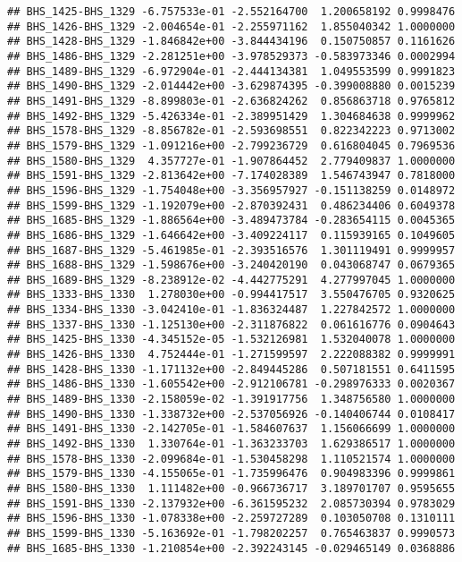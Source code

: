 \documentclass[]{article}
\begin{document}
\begin{verbatim}
## BHS_1425-BHS_1329 -6.757533e-01 -2.552164700  1.200658192 0.9998476
## BHS_1426-BHS_1329 -2.004654e-01 -2.255971162  1.855040342 1.0000000
## BHS_1428-BHS_1329 -1.846842e+00 -3.844434196  0.150750857 0.1161626
## BHS_1486-BHS_1329 -2.281251e+00 -3.978529373 -0.583973346 0.0002994
## BHS_1489-BHS_1329 -6.972904e-01 -2.444134381  1.049553599 0.9991823
## BHS_1490-BHS_1329 -2.014442e+00 -3.629874395 -0.399008880 0.0015239
## BHS_1491-BHS_1329 -8.899803e-01 -2.636824262  0.856863718 0.9765812
## BHS_1492-BHS_1329 -5.426334e-01 -2.389951429  1.304684638 0.9999962
## BHS_1578-BHS_1329 -8.856782e-01 -2.593698551  0.822342223 0.9713002
## BHS_1579-BHS_1329 -1.091216e+00 -2.799236729  0.616804045 0.7969536
## BHS_1580-BHS_1329  4.357727e-01 -1.907864452  2.779409837 1.0000000
## BHS_1591-BHS_1329 -2.813642e+00 -7.174028389  1.546743947 0.7818000
## BHS_1596-BHS_1329 -1.754048e+00 -3.356957927 -0.151138259 0.0148972
## BHS_1599-BHS_1329 -1.192079e+00 -2.870392431  0.486234406 0.6049378
## BHS_1685-BHS_1329 -1.886564e+00 -3.489473784 -0.283654115 0.0045365
## BHS_1686-BHS_1329 -1.646642e+00 -3.409224117  0.115939165 0.1049605
## BHS_1687-BHS_1329 -5.461985e-01 -2.393516576  1.301119491 0.9999957
## BHS_1688-BHS_1329 -1.598676e+00 -3.240420190  0.043068747 0.0679365
## BHS_1689-BHS_1329 -8.238912e-02 -4.442775291  4.277997045 1.0000000
## BHS_1333-BHS_1330  1.278030e+00 -0.994417517  3.550476705 0.9320625
## BHS_1334-BHS_1330 -3.042410e-01 -1.836324487  1.227842572 1.0000000
## BHS_1337-BHS_1330 -1.125130e+00 -2.311876822  0.061616776 0.0904643
## BHS_1425-BHS_1330 -4.345152e-05 -1.532126981  1.532040078 1.0000000
## BHS_1426-BHS_1330  4.752444e-01 -1.271599597  2.222088382 0.9999991
## BHS_1428-BHS_1330 -1.171132e+00 -2.849445286  0.507181551 0.6411595
## BHS_1486-BHS_1330 -1.605542e+00 -2.912106781 -0.298976333 0.0020367
## BHS_1489-BHS_1330 -2.158059e-02 -1.391917756  1.348756580 1.0000000
## BHS_1490-BHS_1330 -1.338732e+00 -2.537056926 -0.140406744 0.0108417
## BHS_1491-BHS_1330 -2.142705e-01 -1.584607637  1.156066699 1.0000000
## BHS_1492-BHS_1330  1.330764e-01 -1.363233703  1.629386517 1.0000000
## BHS_1578-BHS_1330 -2.099684e-01 -1.530458298  1.110521574 1.0000000
## BHS_1579-BHS_1330 -4.155065e-01 -1.735996476  0.904983396 0.9999861
## BHS_1580-BHS_1330  1.111482e+00 -0.966736717  3.189701707 0.9595655
## BHS_1591-BHS_1330 -2.137932e+00 -6.361595232  2.085730394 0.9783029
## BHS_1596-BHS_1330 -1.078338e+00 -2.259727289  0.103050708 0.1310111
## BHS_1599-BHS_1330 -5.163692e-01 -1.798202257  0.765463837 0.9990573
## BHS_1685-BHS_1330 -1.210854e+00 -2.392243145 -0.029465149 0.0368886

\end{verbatim}
\end{document}
